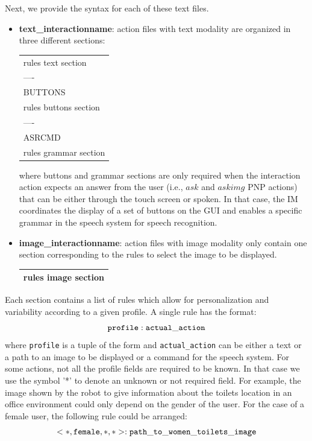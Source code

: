 \documentclass[11pt,a4paper]{article}
\begin{document}
Next, we provide the syntax for each of these text files.
\begin{itemize}
\item \textbf{text\_interactionname}: action files with text modality are organized in three different sections:
{\ttfamily
\begin{center}
  \begin{tabular}{|l|}
    \hline
rules text section\\
----\\
BUTTONS\\
rules buttons section\\
----\\
ASRCMD\\
rules grammar section\\
    \hline
  \end{tabular}
\end{center}
}
where buttons and grammar sections are only required when the interaction action expects an answer from the user (i.e., $ask$ and $askimg$ PNP actions) that can be either through the touch screen or spoken. In that case, the IM coordinates the display of a set of buttons on the GUI and enables a specific grammar in the speech system for speech recognition.

\item \textbf{image\_interactionname}: action files with image modality only contain one section corresponding to the rules to select the image to be displayed.
{\ttfamily
\begin{center}
  \begin{tabular}{|l|}
    \hline
rules image section\\
    \hline
  \end{tabular}
\end{center}
}
\end{itemize}

Each section contains a list of rules which allow for personalization and variability according to a given profile.
A single rule has the format:
\[\tt profile : actual\_action \]
where {\tt profile} is a tuple of the form {\tt<age,gender,language,occupation>} and {\tt actual\_action} can be either a text or a path to an image to be displayed or a command for the speech system. For some actions, not all the profile fields are required to be known. In that case we use the symbol '*' to denote an unknown or not required field.
For example, the image shown by the robot to give information about the toilets location in an office environment could only depend on the gender of the user. For the case of a female user, the following rule could be arranged:
\[\tt<*,female,*,*>: path\_to\_women\_toilets\_image\]
\end{document}
